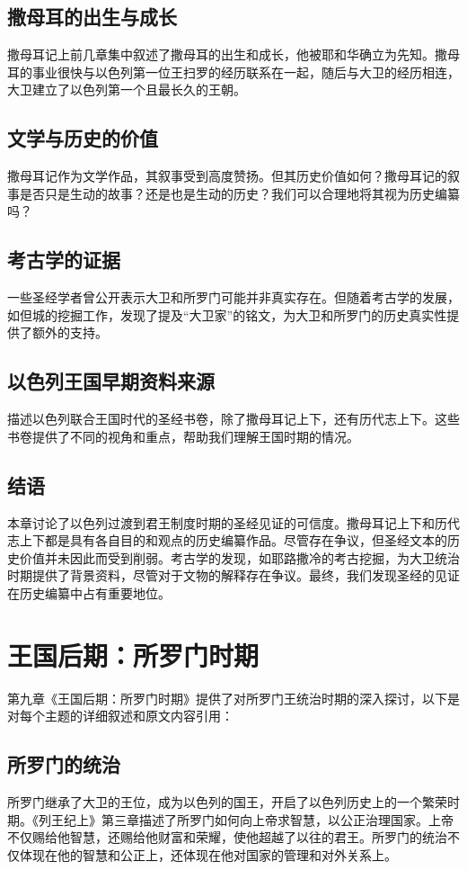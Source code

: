 \documentclass[12pt, a4paper]{ctexart}
\begin{document}
\subsection{撒母耳的出生与成长}
撒母耳记上前几章集中叙述了撒母耳的出生和成长，他被耶和华确立为先知。撒母耳的事业很快与以色列第一位王扫罗的经历联系在一起，随后与大卫的经历相连，大卫建立了以色列第一个且最长久的王朝。

\subsection{文学与历史的价值}
撒母耳记作为文学作品，其叙事受到高度赞扬。但其历史价值如何？撒母耳记的叙事是否只是生动的故事？还是也是生动的历史？我们可以合理地将其视为历史编纂吗？

\subsection{考古学的证据}
一些圣经学者曾公开表示大卫和所罗门可能并非真实存在。但随着考古学的发展，如但城的挖掘工作，发现了提及“大卫家”的铭文，为大卫和所罗门的历史真实性提供了额外的支持。

\subsection{以色列王国早期资料来源}
描述以色列联合王国时代的圣经书卷，除了撒母耳记上下，还有历代志上下。这些书卷提供了不同的视角和重点，帮助我们理解王国时期的情况。

\subsection{结语}
本章讨论了以色列过渡到君王制度时期的圣经见证的可信度。撒母耳记上下和历代志上下都是具有各自目的和观点的历史编纂作品。尽管存在争议，但圣经文本的历史价值并未因此而受到削弱。考古学的发现，如耶路撒冷的考古挖掘，为大卫统治时期提供了背景资料，尽管对于文物的解释存在争议。最终，我们发现圣经的见证在历史编纂中占有重要地位。

\section{王国后期：所罗门时期}

第九章《王国后期：所罗门时期》提供了对所罗门王统治时期的深入探讨，以下是对每个主题的详细叙述和原文内容引用：

\subsection{所罗门的统治}
所罗门继承了大卫的王位，成为以色列的国王，开启了以色列历史上的一个繁荣时期。《列王纪上》第三章描述了所罗门如何向上帝求智慧，以公正治理国家。上帝不仅赐给他智慧，还赐给他财富和荣耀，使他超越了以往的君王。所罗门的统治不仅体现在他的智慧和公正上，还体现在他对国家的管理和对外关系上。
\end{document}
